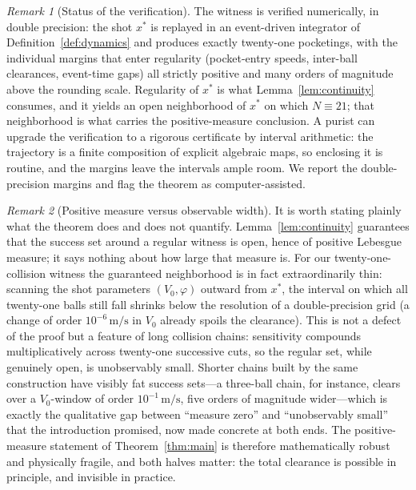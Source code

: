 \documentclass[11pt]{article}
\theoremstyle{definition}
\theoremstyle{remark}
\newtheorem{remark}{Remark}
\begin{document}
\begin{remark}[Status of the verification]
The witness is verified numerically, in double precision: the shot
$x^{*}$ is replayed in an event-driven integrator of
Definition~\ref{def:dynamics} and produces exactly twenty-one
pocketings, with the individual margins that enter regularity
(pocket-entry speeds, inter-ball clearances, event-time gaps) all
strictly positive and many orders of magnitude above the rounding
scale. Regularity of $x^{*}$ is what Lemma~\ref{lem:continuity}
consumes, and it yields an open neighborhood of $x^{*}$ on which
$N \equiv 21$; that neighborhood is what carries the positive-measure
conclusion. A purist can upgrade the verification to a rigorous
certificate by interval arithmetic: the trajectory is a finite
composition of explicit algebraic maps, so enclosing it is routine,
and the margins leave the intervals ample room. We report the
double-precision margins and flag the theorem as computer-assisted.
\end{remark}

\begin{remark}[Positive measure versus observable width]
It is worth stating plainly what the theorem does and does not
quantify. Lemma~\ref{lem:continuity} guarantees that the success set
around a regular witness is open, hence of positive Lebesgue measure;
it says nothing about how large that measure is. For our
twenty-one-collision witness the guaranteed neighborhood is in fact
extraordinarily thin: scanning the shot parameters $(V_0, \varphi)$
outward from $x^{*}$, the interval on which all twenty-one balls still
fall shrinks below the resolution of a double-precision grid (a change
of order $10^{-6}\,\mathrm{m/s}$ in $V_0$ already spoils the
clearance). This is not a defect of the proof but a feature of long
collision chains: sensitivity compounds multiplicatively across
twenty-one successive cuts, so the regular set, while genuinely open,
is unobservably small. Shorter chains built by the same construction
have visibly fat success sets---a three-ball chain, for instance,
clears over a $V_0$-window of order $10^{-1}\,\mathrm{m/s}$, five
orders of magnitude wider---which is exactly the qualitative gap
between ``measure zero'' and ``unobservably small'' that the
introduction promised, now made concrete at both ends. The
positive-measure statement of Theorem~\ref{thm:main} is therefore
mathematically robust and physically fragile, and both halves matter:
the total clearance is possible in principle, and invisible in
practice.
\end{remark}
\end{document}
